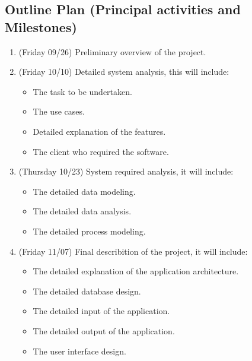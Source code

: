\subsection{Outline Plan (Principal activities and Milestones)}

\begin{enumerate}

\item (Friday 09/26) Preliminary overview of the project.

\item (Friday 10/10) Detailed system analysis, this will include:
	\begin{itemize}
		\item The task to be undertaken.
		\item The use cases.
		\item Detailed explanation of the features.
		\item The client who required the software.
	\end{itemize}

\item (Thursday 10/23) System required analysis, it will include:
	\begin{itemize}
		\item The detailed data modeling.
		\item The detailed data analysis.
		\item The detailed process modeling. 
	\end{itemize}

\item (Friday 11/07) Final describition of the project, it will include:
	\begin{itemize}
		\item The detailed explanation of the application architecture.
		\item The detailed database design.
		\item The detailed input of the application.
		\item The detailed output of the application.
		\item The user interface design.
	\end{itemize}

\end{enumerate}